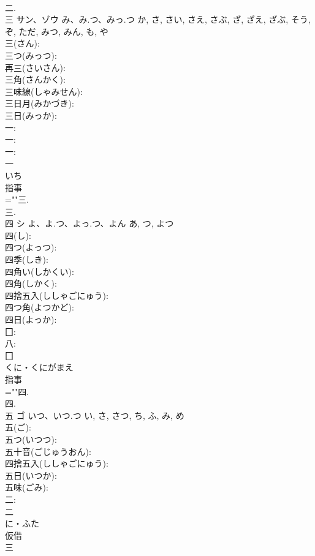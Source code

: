 \documentclass[8pt]{extreport}
\begin{document}
\begin{CJK}{UTF8}{min}
\\	二.
\\	三	サン、ゾウ	み、み.つ、みっ.つ	か, さ, さい, さえ, さぶ, ざ, ざえ, ざぶ, そう, ぞ, ただ, みつ, みん, も, や	
\\	三(さん): 
\\	三つ(みっつ): 
\\	再三(さいさん): 
\\	三角(さんかく): 
\\	三味線(しゃみせん): 
\\	三日月(みかづき): 
\\	三日(みっか): 
\\	一: 
\\	一: 
\\	一: 
\\	一	
\\	いち	
\\	指事 
\\	=""三.
\\	三.
\\	四	シ	よ、よ.つ、よっ.つ、よん	あ, つ, よつ	
\\	四(し): 
\\	四つ(よっつ): 
\\	四季(しき): 
\\	四角い(しかくい): 
\\	四角(しかく): 
\\	四捨五入(ししゃごにゅう): 
\\	四つ角(よつかど): 
\\	四日(よっか): 
\\	囗: 
\\	八: 
\\	囗	
\\	くに・くにがまえ	
\\	指事 
\\	=""四.
\\	四.
\\	五	ゴ	いつ、いつ.つ	い, さ, さつ, ち, ふ, み, め	
\\	五(ご): 
\\	五つ(いつつ): 
\\	五十音(ごじゅうおん): 
\\	四捨五入(ししゃごにゅう): 
\\	五日(いつか): 
\\	五味(ごみ): 
\\	二: 
\\	二	
\\	に・ふた	
\\	仮借 
\\	三 

\end{CJK}
\end{document}
